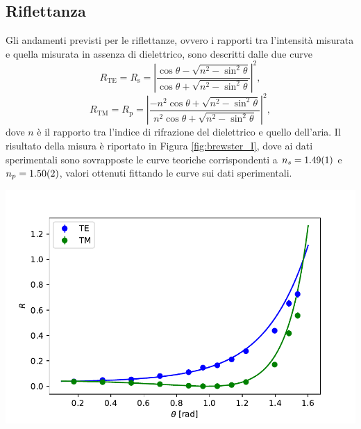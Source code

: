 \documentclass[10pt,oneside,a4paper]{article}
\newenvironment{Figure}
  {\par\medskip\noindent\minipage{\linewidth}}
  {\endminipage\par\medskip}
\begin{document}
\begin{multicols}{2}
\subsection{Riflettanza}
Gli andamenti previsti per le riflettanze, ovvero i rapporti tra l'intensità misurata e quella misurata in assenza di dielettrico, sono descritti dalle due curve
\begin{equation}\label{eq:rs}
	R_{\mathrm{TE}} = R_\mathrm{s} = \left\vert \frac{\cos \theta - \sqrt{n^2 - \sin^2 \theta}}{\cos \theta + \sqrt{n^2 - \sin^2 \theta}} \right\vert^2,
\end{equation}
\begin{equation}\label{eq:rs}
	R_{\mathrm{TM}} = R_\mathrm{p} =  \left\vert \frac{-n^2 \cos \theta + \sqrt{n^2 - \sin^2 \theta}}{n^2 \cos \theta + \sqrt{n^2 - \sin^2 \theta}} \right\vert^2,
\end{equation}
dove $n$ è il rapporto tra l'indice di rifrazione del dielettrico e quello dell'aria.
Il risultato della misura è riportato in Figura \ref{fig:brewster_I}, dove ai dati sperimentali sono sovrapposte le curve teoriche corrispondenti a $n_s = \SI{1.49 \pm 0.01}{}$ e $n_p = \SI{1.50 \pm 0.02}{}$, valori ottenuti fittando le curve sui dati sperimentali.
\begin{Figure}
	\begin{center}
	\includegraphics[width=\linewidth]{riflettanze.pdf}
	\label{fig:brewster_I}
	\end{center}
\end{Figure}


\end{multicols}
\end{document}
